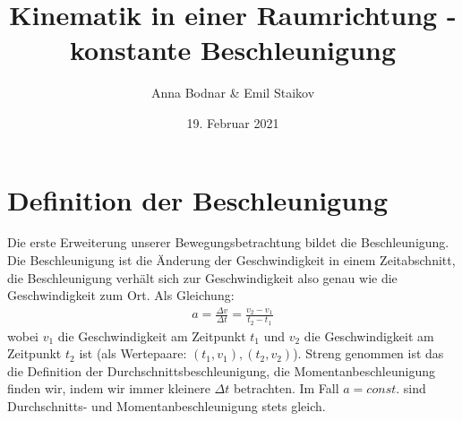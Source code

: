 \documentclass[11pt]{article}
\title{Kinematik in einer Raumrichtung - konstante Beschleunigung}
\author{Anna Bodnar \& Emil Staikov}
\date{19. Februar 2021}
\begin{document}
\maketitle
\section{Definition der Beschleunigung}
Die erste Erweiterung unserer Bewegungsbetrachtung bildet die Beschleunigung. Die Beschleunigung ist die Änderung der Geschwindigkeit in einem Zeitabschnitt, die Beschleunigung verhält sich zur Geschwindigkeit also genau wie die Geschwindigkeit zum Ort. Als Gleichung:
\begin{gather}
    a = \frac{\Delta v}{\Delta t} = \frac{v_2 - v_1}{t_2 - t_1}
\end{gather}
wobei $v_1$ die Geschwindigkeit am Zeitpunkt $t_1$ und $v_2$ die Geschwindigkeit am Zeitpunkt $t_2$ ist (als Wertepaare: $(t_1, v_1), (t_2, v_2)$). Streng genommen ist das die Definition der Durchschnittsbeschleunigung, die Momentanbeschleunigung finden wir, indem wir immer kleinere $\Delta t$ betrachten. Im Fall $a = const.$ sind Durchschnitts- und Momentanbeschleunigung stets gleich. 
\end{document}
